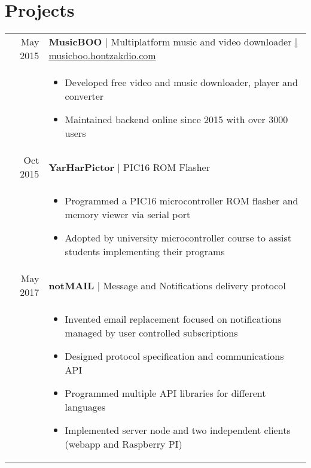 \documentclass[a4paper,10pt]{article}
\begin{document}
\section{Projects}
\begin{tabular}{rp{14.85cm}}

 May 2015 & \textbf{MusicBOO} | Multiplatform music and video downloader \href{http://musicboo.hontzakdio.com/}{\hfill | \footnotesize musicboo.hontzakdio.com}\\
 & \footnotesize{ \begin{itemize}[noitemsep,topsep=3pt]
 \vspace{-0.1in}
 \item Developed free video and music downloader, player and converter
 \item Maintained backend online since 2015 with over 3000 users
 \end{itemize}} \\

 Oct 2015 & \textbf{YarHarPictor} | PIC16 ROM Flasher \\
 & \footnotesize{ \begin{itemize}[noitemsep,topsep=3pt]
 \vspace{-0.1in}
 \item Programmed a PIC16 microcontroller ROM flasher and memory viewer via serial port
 \item Adopted by university microcontroller course to assist students implementing their programs
 \end{itemize}} \\

 May 2017 & \textbf{notMAIL} | Message and Notifications delivery protocol \\
 & \footnotesize{ \begin{itemize}[noitemsep,topsep=3pt]
 \vspace{-0.1in}
 \item Invented email replacement focused on notifications managed by user controlled subscriptions
 \item Designed protocol specification and communications API
 \item Programmed multiple API libraries for different languages
 \item Implemented server node and two independent clients (webapp and Raspberry PI)
 \end{itemize}} \\



\end{tabular}
\end{document}
